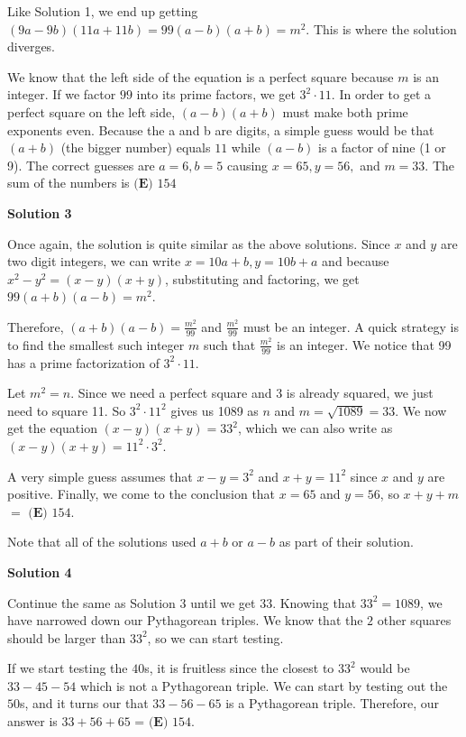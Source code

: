 \begin{enumerate}
 Like Solution 1, we end up getting $(9a - 9b)(11a + 11b) = 99(a-b)(a+b) = m^2$.  This is where the solution diverges.  

 We know that the left side of the equation is a perfect square because $m$ is an integer.  If we factor $99$ into its prime factors, we get $3^2\cdot 11$.  In order to get a perfect square on the left side, $(a-b)(a+b)$ must make both prime exponents even.  Because the a and b are digits, a simple guess would be that $(a+b)$ (the bigger number) equals $11$ while $(a-b)$ is a factor of nine (1 or 9).  The correct guesses are $a = 6, b = 5$ causing $x = 65, y = 56,$ and $m = 33$.  The sum of the numbers is $\boxed{\textbf{(E) }154}$




\textbf{Solution 3}

Once again, the solution is quite similar as the above solutions. Since $x$ and $y$ are two digit integers, we can write $x = 10a+b, y = 10b+a$ and because $x^2 - y^2 = (x-y)(x+y)$, substituting and factoring, we get $99(a+b)(a-b) = m^2$. 

 Therefore, $(a+b)(a-b) = \frac{m^2}{99}$ and $\frac{m^2}{99}$ must be an integer. A quick strategy is to find the smallest such integer $m$ such that $\frac{m^2}{99}$ is an integer. We notice that 99 has a prime factorization of $3^2 \cdot 11.$

 Let $m^2 = n.$ Since we need a perfect square and 3 is already squared, we just need to square 11. So $3^2 \cdot 11^2$ gives us 1089 as $n$ and $m = \sqrt{1089} = 33.$ We now get the equation $(x-y)(x+y) = 33^2$, which we can also write as     $(x-y)(x+y) = 11^2 \cdot 3^2$.

 A very simple guess assumes that $x-y=3^2$ and $x+y=11^2$ since $x$ and $y$ are positive. Finally, we come to the conclusion that $x=65$ and $y=56$, so $x+y+m$ $=$ $\boxed{\textbf{(E) }154}$.

 Note that all of the solutions used $a+b$ or $a-b$ as part of their solution.

 



\textbf{Solution 4}

Continue the same as Solution $3$ until we get $33$. Knowing that $33^2 = 1089$, we have narrowed down our Pythagorean triples. We know that the $2$ other squares should be larger than $33^2$, so we can start testing. 

 If we start testing the $40$s, it is fruitless since the closest to $33^2$ would be $33 - 45 - 54$ which is not a Pythagorean triple. We can start by testing out the $50$s, and it turns our that $33 - 56 - 65$ is a Pythagorean triple. Therefore, our answer is $33+56+65$ = $\boxed{\textbf{(E) }154}$.


\end{enumerate}
